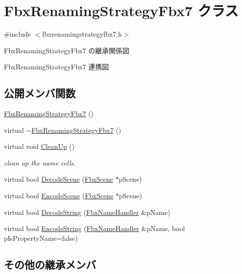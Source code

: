 \hypertarget{class_fbx_renaming_strategy_fbx7}{}\section{Fbx\+Renaming\+Strategy\+Fbx7 クラス}
\label{class_fbx_renaming_strategy_fbx7}


{\ttfamily \#include $<$fbxrenamingstrategyfbx7.\+h$>$}



Fbx\+Renaming\+Strategy\+Fbx7 の継承関係図


Fbx\+Renaming\+Strategy\+Fbx7 連携図
\subsection*{公開メンバ関数}
\begin{DoxyCompactItemize}
\item 
\hyperlink{class_fbx_renaming_strategy_fbx7_aef27c04b8c4d38bcc8e969e512464cd3}{Fbx\+Renaming\+Strategy\+Fbx7} ()
\item 
virtual \hyperlink{class_fbx_renaming_strategy_fbx7_aa069f7a937b771bae4657132f8a5006b}{$\sim$\+Fbx\+Renaming\+Strategy\+Fbx7} ()
\item 
virtual void \hyperlink{class_fbx_renaming_strategy_fbx7_a4495cc04e089d7e0d432e50a3161ea50}{Clean\+Up} ()
\begin{DoxyCompactList}\small\item\em clean up the name cells. \end{DoxyCompactList}\item 
virtual bool \hyperlink{class_fbx_renaming_strategy_fbx7_a203a4659e427f4c6046eff93031a24bf}{Decode\+Scene} (\hyperlink{class_fbx_scene}{Fbx\+Scene} $\ast$p\+Scene)
\item 
virtual bool \hyperlink{class_fbx_renaming_strategy_fbx7_a9c3d4574319c2e744a80d66f6c7c0ae3}{Encode\+Scene} (\hyperlink{class_fbx_scene}{Fbx\+Scene} $\ast$p\+Scene)
\item 
virtual bool \hyperlink{class_fbx_renaming_strategy_fbx7_a9f8f8714746bdc9904c31741e0b595f6}{Decode\+String} (\hyperlink{class_fbx_name_handler}{Fbx\+Name\+Handler} \&p\+Name)
\item 
virtual bool \hyperlink{class_fbx_renaming_strategy_fbx7_ae7ce3bfd32c1cb7c8ac420972287760e}{Encode\+String} (\hyperlink{class_fbx_name_handler}{Fbx\+Name\+Handler} \&p\+Name, bool p\+Is\+Property\+Name=false)
\end{DoxyCompactItemize}
\subsection*{その他の継承メンバ}


